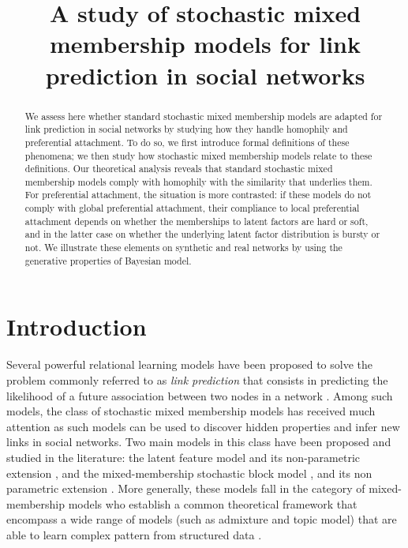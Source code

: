 \documentclass[journal]{IEEEtran}
\title{A study of stochastic mixed membership models for link prediction in social networks}
\begin{document}
\maketitle

\begin{abstract}
We assess here whether standard stochastic mixed membership models are adapted for link prediction in social networks by studying how they handle homophily and preferential attachment. To do so, we first introduce formal definitions of these phenomena; we then study how stochastic mixed membership models relate to these definitions. Our theoretical analysis reveals that standard stochastic mixed membership models comply with homophily with the similarity that underlies them. For preferential attachment, the situation is more contrasted: if these models do not comply with global preferential attachment, their compliance to local preferential attachment depends on whether the memberships to latent factors are hard or soft, and in the latter case on whether the underlying latent factor distribution is bursty or not. We illustrate these elements on synthetic and real networks by using the generative properties of Bayesian model.
\end{abstract}

\IEEEpeerreviewmaketitle

\section{Introduction}
\label{sec:intro}

Several powerful relational learning models have been proposed to solve the problem commonly referred to as \textit{link prediction} that consists in predicting the likelihood of a future association between two nodes in a network \cite{LibenNowell07,HassanZaki11}. Among such models, the class of stochastic mixed membership models has received much attention as such models can be used to discover hidden properties and infer new links in social networks. Two main models in this class have been proposed and studied in the literature: the latent feature model \cite{BMF} and its non-parametric extension \cite{ILFRM}, and the mixed-membership stochastic block model \cite{MMSB}, and its non parametric extension \cite{iMMSB,diMMSB}. More generally, these models fall in the category of mixed-membership models who establish a common theoretical framework that encompass a wide range of models (such as admixture and topic model) that are able to  learn complex pattern from structured data \cite{airoldi2014handbook}.
\end{document}
